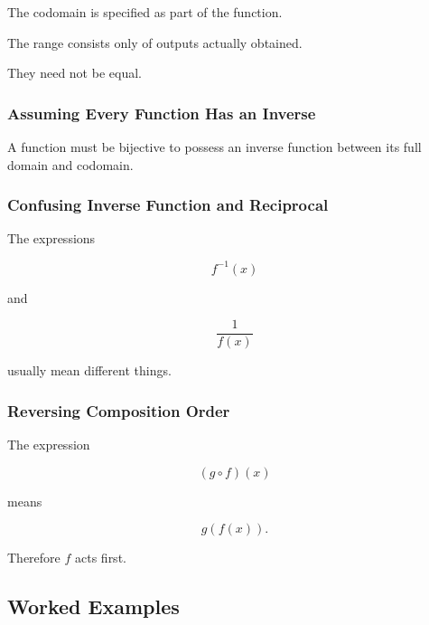 The codomain is specified as part of the function.

The range consists only of outputs actually obtained.

They need not be equal.

\subsubsection{Assuming Every Function Has an Inverse}
\label{subsec:function-error-inverse}

A function must be bijective to possess an inverse function between its full
domain and codomain.

\subsubsection{Confusing Inverse Function and Reciprocal}
\label{subsec:function-error-inverse-reciprocal}

The expressions

\[ f^{-1}(x) \]

and

\[ \frac1{f(x)} \]

usually mean different things.

\subsubsection{Reversing Composition Order}
\label{subsec:function-error-composition}

The expression

\[ (g\circ f)(x) \]

means

\[ g(f(x)). \]

Therefore \(f\) acts first.

\subsection{Worked Examples}
\label{subsec:functions-worked-examples}

